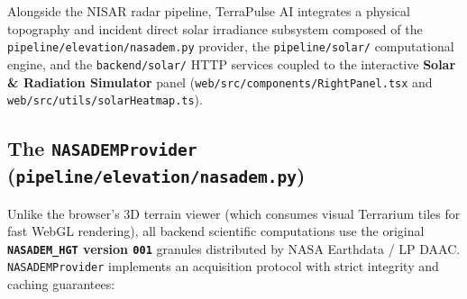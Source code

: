 \documentclass[11pt,a4paper]{article}
\newcommand{\src}[1]{\nolinkurl{#1}}
\begin{document}
Alongside the NISAR radar pipeline, TerraPulse AI integrates a physical topography and incident direct solar
irradiance subsystem composed of the \src{pipeline/elevation/nasadem.py} provider, the \src{pipeline/solar/}
computational engine, and the \src{backend/solar/} HTTP services coupled to the interactive \textbf{Solar \&
Radiation Simulator} panel (\src{web/src/components/RightPanel.tsx} and \src{web/src/utils/solarHeatmap.ts}).

\subsection{The \texttt{NASADEMProvider} (\src{pipeline/elevation/nasadem.py})}

Unlike the browser's 3D terrain viewer (which consumes visual Terrarium tiles for fast WebGL rendering), all
backend scientific computations use the original \textbf{\texttt{NASADEM\_HGT} version \texttt{001}} granules
distributed by NASA Earthdata / LP DAAC. \texttt{NASADEMProvider} implements an acquisition protocol with strict
integrity and caching guarantees:
\end{document}

